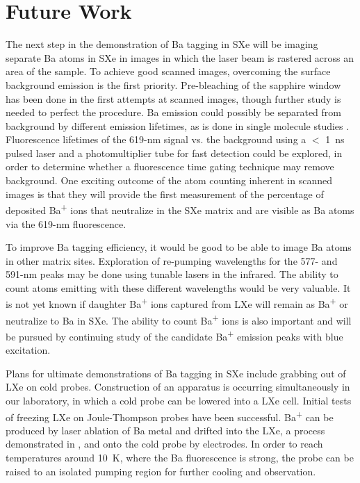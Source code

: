 \section{Future Work}
\label{sec:future}

The next step in the demonstration of Ba tagging in SXe will be imaging separate Ba atoms in SXe in images in which the laser beam is rastered across an area of the sample.  To achieve good scanned images, overcoming the surface background emission is the first priority.  Pre-bleaching of the sapphire window has been done in the first attempts at scanned images, though further study is needed to perfect the procedure.  Ba emission could possibly be separated from background by different emission lifetimes, as is done in single molecule studies \cite{singleMoleculePulsed}.  Fluorescence lifetimes of the 619-nm signal vs. the background using a $<$ 1~ns pulsed laser and a photomultiplier tube for fast detection could be explored, in order to determine whether a fluorescence time gating technique may remove background.  One exciting outcome of the atom counting inherent in scanned images is that they will provide the first measurement of the percentage of deposited Ba\textsuperscript{+} ions that neutralize in the SXe matrix and are visible as Ba atoms via the 619-nm fluorescence.

To improve Ba tagging efficiency, it would be good to be able to image Ba atoms in other matrix sites.  Exploration of re-pumping wavelengths for the 577- and 591-nm peaks may be done using tunable lasers in the infrared.  The ability to count atoms emitting with these different wavelengths would be very valuable.  It is not yet known if daughter Ba\textsuperscript{+} ions captured from LXe will remain as Ba\textsuperscript{+} or neutralize to Ba in SXe.  The ability to count Ba\textsuperscript{+} ions is also important and will be pursued by continuing study of the candidate Ba\textsuperscript{+} emission peaks with blue excitation.

Plans for ultimate demonstrations of Ba tagging in SXe include grabbing out of LXe on cold probes.  Construction of an apparatus is occurring simultaneously in our laboratory, in which a cold probe can be lowered into a LXe cell.  Initial tests of freezing LXe on Joule-Thompson probes have been successful.  Ba\textsuperscript{+} can be produced by laser ablation of Ba metal and drifted into the LXe, a process demonstrated in \cite{Kendy}, and onto the cold probe by electrodes.  In order to reach temperatures around 10~K, where the Ba fluorescence is strong, the probe can be raised to an isolated pumping region for further cooling and observation.

